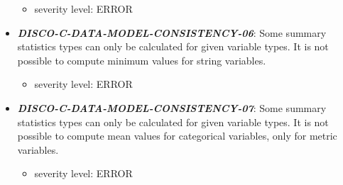 \documentclass{llncs}
\begin{document}
\begin{itemize}
		\begin{itemize}
		\item severity level: ERROR
	\end{itemize}
	\item \textbf{{\em DISCO-C-DATA-MODEL-CONSISTENCY-06}}: 
	Some summary statistics types can only be calculated for given variable types. 
	It is not possible to compute minimum values for string variables.
		\begin{itemize}
		\item severity level: ERROR
	\end{itemize}
	\item \textbf{{\em DISCO-C-DATA-MODEL-CONSISTENCY-07}}: 
	Some summary statistics types can only be calculated for given variable types. 
	It is not possible to compute mean values for categorical variables, only for metric variables.
		\begin{itemize}
		\item severity level: ERROR
	\end{itemize}
\end{itemize}
\end{document}
